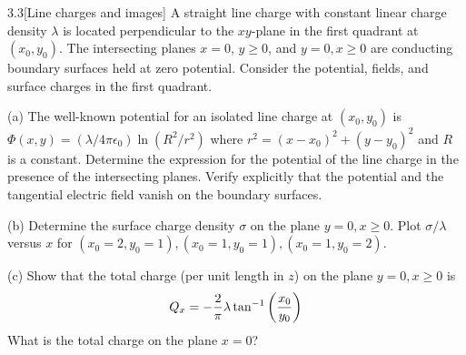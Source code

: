 \documentclass[12pt]{article}
\begin{document}
\begin{problem}{3.3}[Line charges and images]
A straight line charge with constant linear charge density $\lambda$ is located
perpendicular to the $xy$-plane in the first quadrant at $(x_0,y_0)$. The
intersecting planes $x=0$, $y\geq0$, and $y=0,x\geq0$ are conducting boundary
surfaces held at zero potential. Consider the potential, fields, and surface
charges in the first quadrant.

(a) The well-known potential for an isolated line charge at $(x_0,y_0)$ is\\
$\Phi(x,y)=(\lambda/4\pi\epsilon_0)\ln(R^2/r^2)$ where $r^2=(x-x_0)^2+(y-y_0)^2$
and $R$ is a constant. Determine the expression for the potential of the line
charge in the presence of the intersecting planes. Verify explicitly that the
potential and the tangential electric field vanish on the boundary surfaces.

(b) Determine the surface charge density $\sigma$ on the plane $y=0,x\geq0$.
Plot $\sigma/\lambda$ versus $x$ for
$(x_0=2,y_0=1),(x_0=1,y_0=1),(x_0=1,y_0=2)$.

(c) Show that the total charge (per unit length in $z$) on the plane $y=0,x\geq
0$ is
\begin{equation}
    Q_x=-\frac2\pi\lambda\tan^{-1}\qty(\frac{x_0}{y_0}) 
\end{equation}
What is the total charge on the plane $x=0$?


\end{problem}
\end{document}
